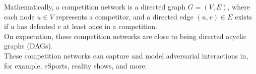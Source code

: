 \documentclass[preview]{standalone}
\begin{document}
Mathematically, a competition network is a directed graph $G = (V, E)$, where each node $u \in V$ represents a competitor, and a directed edge $(u, v) \in E$ exists if $u$ has defeated $v$ at least once in a competition.\\On expectation, these competition networks are close to being directed acyclic graphs (DAGs).\\These competition networks can capture and model adversarial interactions in, for example, eSports, reality shows, and more.\\
\end{document}

